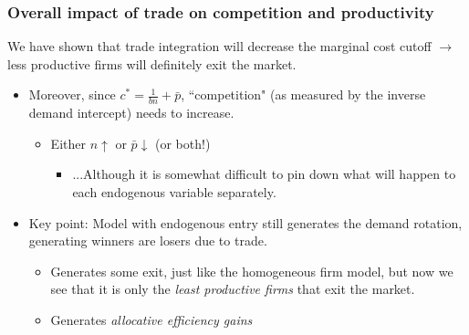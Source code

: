 \documentclass{beamer}
\begin{document}
\begin{frame}
	\frametitle{Overall impact of trade on competition and productivity}
We have shown that trade integration will decrease the marginal cost cutoff $\rightarrow$ less productive firms will definitely exit the market. 
	\begin{itemize}
		\item Moreover, since $c^*=\frac{1}{bn} +\bar{p}$, ``competition" (as measured by the inverse demand intercept) needs to increase.
			\begin{itemize}
				\item Either $n \uparrow$ or $\bar{p} \downarrow $ (or both!)
					\begin{itemize}
						\item ...Although it is somewhat difficult to pin down what will happen to each endogenous variable separately.
					\end{itemize}
			\end{itemize}
		\item Key point: Model with endogenous entry still generates the demand rotation, generating winners are losers due to trade.
			\begin{itemize}
				\item Generates some exit, just like the homogeneous firm model, but now we see that it is only the \emph{least productive firms} that exit the market.
				\item Generates \emph{allocative efficiency gains}
			\end{itemize}
	\end{itemize}

\end{frame}
\end{document}
